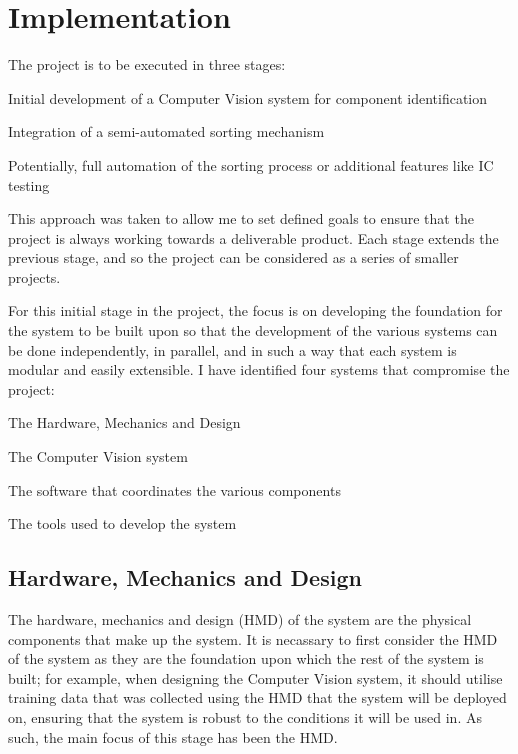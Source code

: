 \section{Implementation}
The project is to be executed in three stages:
\begin{mylist}
  \item Initial development of a Computer Vision system for component identification
  \item Integration of a semi-automated sorting mechanism
  \item Potentially, full automation of the sorting process or additional features like IC testing
\end{mylist}
This approach was taken to allow me to set defined goals to ensure that the project is always working towards a deliverable product.
Each stage extends the previous stage, and so the project can be considered as a series of smaller projects. 

For this initial stage in the project, the focus is on developing the foundation for the system to be built upon so that
the development of the various systems can be done independently, in parallel, and in such a way that each system
is modular and easily extensible.
I have identified four systems that compromise the project:
\begin{mylist}
  \item The Hardware, Mechanics and Design
  \item The Computer Vision system
  \item The software that coordinates the various components
  \item The tools used to develop the system
\end{mylist}
\subsection{Hardware, Mechanics and Design}
The hardware, mechanics and design (HMD) of the system are the physical components that make up the system.
It is necassary to first consider the HMD of the system as they are the foundation upon which the rest of the system is built;
for example, when designing the Computer Vision system, it should utilise training data that was collected using the HMD 
that the system will be deployed on, ensuring that the system is robust to the conditions it will be used in. As such,
the main focus of this stage has been the HMD.
